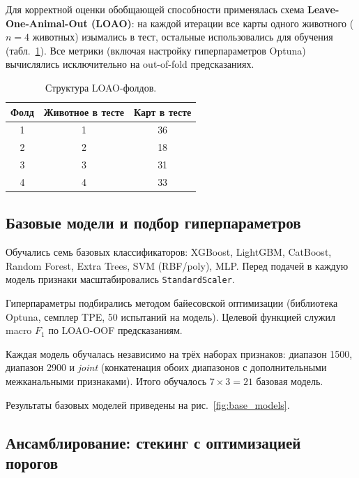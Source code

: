 \documentclass[12pt, a4paper]{article}
\begin{document}
Для корректной оценки обобщающей способности применялась схема
\textbf{Leave-One-Animal-Out (LOAO)}: на каждой итерации все карты
одного животного ($n = 4$ животных) изымались в тест,
остальные использовались для обучения (табл.~\ref{tab:loao}).
Все метрики (включая настройку гиперпараметров Optuna)
вычислялись исключительно на out-of-fold предсказаниях.

\begin{table}[H]
\centering
\caption{Структура LOAO-фолдов.}
\label{tab:loao}
\begin{tabular}{ccc}
\toprule
\textbf{Фолд} & \textbf{Животное в тесте} & \textbf{Карт в тесте} \\
\midrule
1 & 1 & 36 \\
2 & 2 & 18 \\
3 & 3 & 31 \\
4 & 4 & 33 \\
\bottomrule
\end{tabular}
\end{table}

\subsection{Базовые модели и подбор гиперпараметров}

Обучались семь базовых классификаторов:
XGBoost, LightGBM, CatBoost, Random Forest, Extra Trees, SVM (RBF/poly),
MLP. Перед подачей в каждую модель признаки масштабировались
\texttt{StandardScaler}.

Гиперпараметры подбирались методом байесовской оптимизации
(библиотека Optuna, семплер TPE, 50 испытаний на модель).
Целевой функцией служил macro $F_1$ по LOAO-OOF предсказаниям.

Каждая модель обучалась независимо на трёх наборах признаков:
диапазон 1500, диапазон 2900 и \textit{joint} (конкатенация обоих
диапазонов с дополнительными межканальными признаками).
Итого обучалось $7 \times 3 = 21$ базовая модель.

Результаты базовых моделей приведены на рис.~\ref{fig:base_models}.

\subsection{Ансамблирование: стекинг с оптимизацией порогов}
\end{document}
